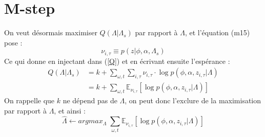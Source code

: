 \documentclass[a4paper,12pt]{article}
\begin{document}
\section{M-step}
On veut désormais maximiser $Q(\Lambda|\Lambda_s)$ par rapport à $\Lambda$, et l'équation (m15) pose :
\begin{equation*}
\nu_{i,\tau} \equiv p(z|\phi,\alpha,\Lambda_s)
\end{equation*}
Ce qui donne en injectant dans (\ref{Q}) et en écrivant ensuite l'espérance :
\begin{align}
Q(\Lambda|\Lambda_s) & = k + \displaystyle\sum_{\omega,t} \displaystyle\sum_{i, \tau} \nu_{i,\tau} \cdot \log p(\phi, \alpha, z_{i, \tau} | \Lambda) \nonumber \\
& = k + \displaystyle\sum_{\omega,t} \mathbb{E}_{\nu_{i,\tau}} [\log p(\phi, \alpha, z_{i, \tau} | \Lambda)] \label{Qexp}
\end{align}
On rappelle que $k$ ne dépend pas de $\Lambda$, on peut donc l'exclure de la maximisation par rapport à $\Lambda$, et ainsi :
\begin{equation*}
\hat\Lambda \leftarrow argmax_\Lambda \; \displaystyle\sum_{\omega,t} \mathbb{E}_{\nu_{i,\tau}} [\log p(\phi, \alpha, z_{i, \tau} | \Lambda)]
\end{equation*}
\end{document}

